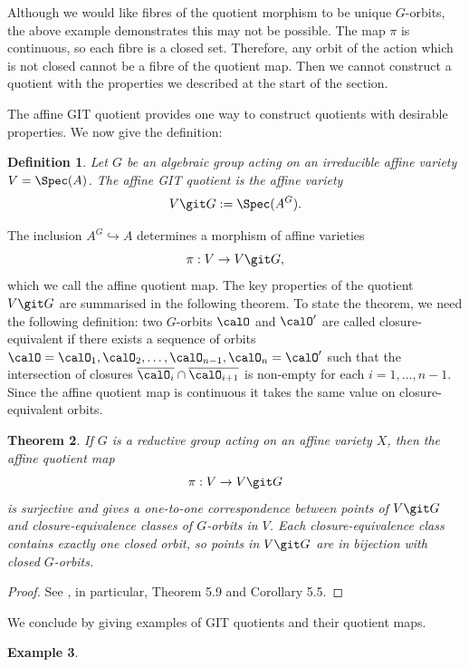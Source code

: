 \documentclass[12pt]{amsart}
\theoremstyle{plain}
\newtheorem{theorem}{Theorem}[subsection]
\newtheorem{definition}[theorem]{Definition}
\theoremstyle{definition}
\newtheorem{example}[theorem]{Example}
\begin{document}
Although we would like fibres of the quotient morphism to be unique $G$-orbits, the above example demonstrates this may not be possible.
The map $\pi$ is continuous, so each fibre is a closed set.
Therefore, any orbit of the action which is not closed cannot be a fibre of the quotient map.
Then we cannot construct a quotient with the properties we described at the start of the section.

The affine GIT quotient provides one way to construct quotients with desirable properties.
We now give the definition:

\begin{definition}
Let $G$ be an algebraic group acting on an irreducible affine variety $V = \Spec(A)$.
The affine GIT quotient is the affine variety
$$V \git G := \Spec(A^G).$$
\end{definition}

The inclusion $A^G \hookrightarrow A$ determines a morphism of affine varieties
$$\pi : V \to V \git G,$$
which we call the affine quotient map.
The key properties of the quotient $V \git G$ are summarised in the following theorem.
To state the theorem, we need the following definition:
two $G$-orbits $\calO$ and $\calO'$ are called closure-equivalent if there exists a sequence of orbits $\calO = \calO_1, \calO_2, \ldots, \calO_{n-1}, \calO_n = \calO'$ such that the intersection of closures $\overline{\calO_i} \cap \overline{\calO_{i+1}}$ is non-empty for each $i=1, \ldots, n-1$.
Since the affine quotient map is continuous it takes the same value on closure-equivalent orbits.

\begin{theorem}
If $G$ is a reductive group acting on an affine variety $X$, then the affine quotient map
$$\pi : V \to V \git G$$
is surjective and gives a one-to-one correspondence between points of $V \git G$ and closure-equivalence classes of $G$-orbits in $V$.
Each closure-equivalence class contains exactly one closed orbit, so points in $V \git G$ are in bijection with closed $G$-orbits.
\end{theorem}
\begin{proof}
See \cite[\S 5.1]{Mukai03}, in particular, Theorem 5.9 and Corollary 5.5.
\end{proof}

We conclude by giving examples of GIT quotients and their quotient maps.

\begin{example}

\end{example}
\end{document}

